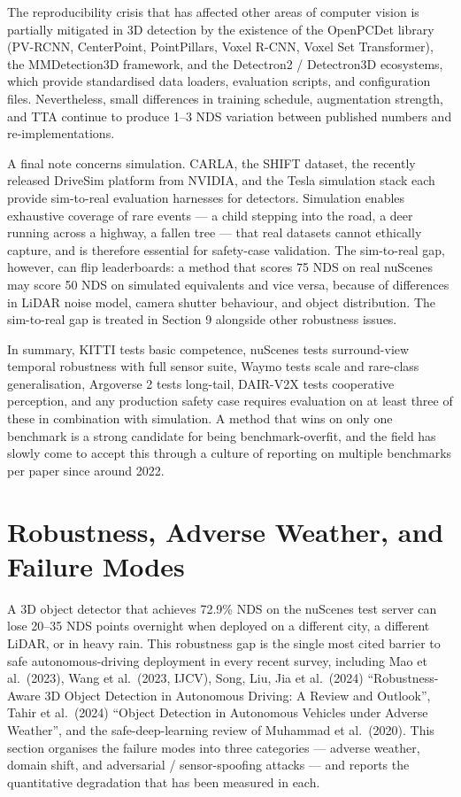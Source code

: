 \documentclass{article}
\begin{document}
The reproducibility crisis that has affected other areas of computer vision is partially mitigated in 3D detection by the existence of the OpenPCDet library (PV-RCNN, CenterPoint, PointPillars, Voxel R-CNN, Voxel Set Transformer), the MMDetection3D framework, and the Detectron2 / Detectron3D ecosystems, which provide standardised data loaders, evaluation scripts, and configuration files. Nevertheless, small differences in training schedule, augmentation strength, and TTA continue to produce 1--3 NDS variation between published numbers and re-implementations.

A final note concerns simulation. CARLA, the SHIFT dataset, the recently released DriveSim platform from NVIDIA, and the Tesla simulation stack each provide sim-to-real evaluation harnesses for detectors. Simulation enables exhaustive coverage of rare events --- a child stepping into the road, a deer running across a highway, a fallen tree --- that real datasets cannot ethically capture, and is therefore essential for safety-case validation. The sim-to-real gap, however, can flip leaderboards: a method that scores 75 NDS on real nuScenes may score 50 NDS on simulated equivalents and vice versa, because of differences in LiDAR noise model, camera shutter behaviour, and object distribution. The sim-to-real gap is treated in Section 9 alongside other robustness issues.

In summary, KITTI tests basic competence, nuScenes tests surround-view temporal robustness with full sensor suite, Waymo tests scale and rare-class generalisation, Argoverse 2 tests long-tail, DAIR-V2X tests cooperative perception, and any production safety case requires evaluation on at least three of these in combination with simulation. A method that wins on only one benchmark is a strong candidate for being benchmark-overfit, and the field has slowly come to accept this through a culture of reporting on multiple benchmarks per paper since around 2022.
\section{Robustness, Adverse Weather, and Failure Modes}\label{sec:robustness-adverse-weather-and-failure-modes}
A 3D object detector that achieves 72.9\% NDS on the nuScenes test server can lose 20--35 NDS points overnight when deployed on a different city, a different LiDAR, or in heavy rain. This robustness gap is the single most cited barrier to safe autonomous-driving deployment in every recent survey, including Mao et al.~(2023), Wang et al.~(2023, IJCV), Song, Liu, Jia et al.~(2024) ``Robustness-Aware 3D Object Detection in Autonomous Driving: A Review and Outlook'', Tahir et al.~(2024) ``Object Detection in Autonomous Vehicles under Adverse Weather'', and the safe-deep-learning review of Muhammad et al.~(2020). This section organises the failure modes into three categories --- adverse weather, domain shift, and adversarial / sensor-spoofing attacks --- and reports the quantitative degradation that has been measured in each.
\end{document}
